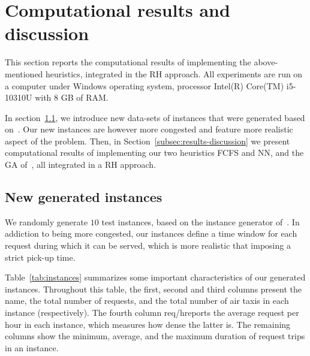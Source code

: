 
\section{Computational results and discussion}
\label{sec:results}

This section reports the computational results of implementing the above-mentioned heuristics, integrated in the \acs{RH} approach. All experiments are run on a computer under Windows operating system, processor Intel(R) Core(TM) i5-10310U with 8 GB of RAM. 

In section~\ref{subsec:instances}, we introduce new data-sets of instances that were generated based on~\cite{panwadee2021}. Our new instances are however more congested and feature more realistic aspect of the problem. Then, in Section~\ref{subsec:results-discussion} we present computational results of implementing our two heuristics \acs{FCFS} and \acs{NN}, and the \acs{GA} of~\cite{panwadee2021}, all integrated in a \acs{RH} approach.


\subsection{New generated instances}
\label{subsec:instances}

We randomly generate $10$ test instances, based on the instance generator of~\cite{panwadee2021}. In addiction to being more congested, our instances define a time window for each request during which it can be served, which is more realistic that imposing a strict pick-up time.

Table~\ref{tab:instances} summarizes some important characteristics of our generated instances. Throughout this table, the first, second and third columns present the name, the total number of requests, and the total number of air taxis in each instance (respectively). The fourth column \og req/h\fg  reports the average request per hour in each instance, which measures how dense the latter is. The remaining columns show the minimum, average, and the maximum duration of request trips in an instance. 

